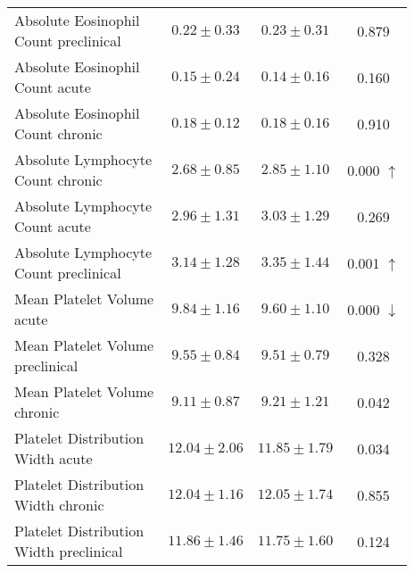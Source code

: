 \begin{table}[htbp]
\begin{tabular}{lccc}
\makecell[l]{Absolute Eosinophil \\ Count preclinical} & $0.22 \pm 0.33$ & $0.23 \pm 0.31$ & 0.879  \\

\makecell[l]{Absolute Eosinophil \\ Count acute} & $0.15 \pm 0.24$ & $0.14 \pm 0.16$ & 0.160  \\

\makecell[l]{Absolute Eosinophil \\ Count chronic} & $0.18 \pm 0.12$ & $0.18 \pm 0.16$ & 0.910  \\

\makecell[l]{Absolute Lymphocyte \\ Count chronic} & $2.68 \pm 0.85$ & $2.85 \pm 1.10$ & 0.000 $\uparrow$ \\

\makecell[l]{Absolute Lymphocyte \\ Count acute} & $2.96 \pm 1.31$ & $3.03 \pm 1.29$ & 0.269  \\

\makecell[l]{Absolute Lymphocyte \\ Count preclinical} & $3.14 \pm 1.28$ & $3.35 \pm 1.44$ & 0.001 $\uparrow$ \\

\makecell[l]{Mean Platelet Volume \\ acute} & $9.84 \pm 1.16$ & $9.60 \pm 1.10$ & 0.000 $\downarrow$ \\

\makecell[l]{Mean Platelet Volume \\ preclinical} & $9.55 \pm 0.84$ & $9.51 \pm 0.79$ & 0.328  \\

\makecell[l]{Mean Platelet Volume \\ chronic} & $9.11 \pm 0.87$ & $9.21 \pm 1.21$ & 0.042  \\

\makecell[l]{Platelet Distribution \\ Width acute} & $12.04 \pm 2.06$ & $11.85 \pm 1.79$ & 0.034  \\

\makecell[l]{Platelet Distribution \\ Width chronic} & $12.04 \pm 1.16$ & $12.05 \pm 1.74$ & 0.855  \\

\makecell[l]{Platelet Distribution \\ Width preclinical} & $11.86 \pm 1.46$ & $11.75 \pm 1.60$ & 0.124  \\


\end{tabular}
\end{table}
